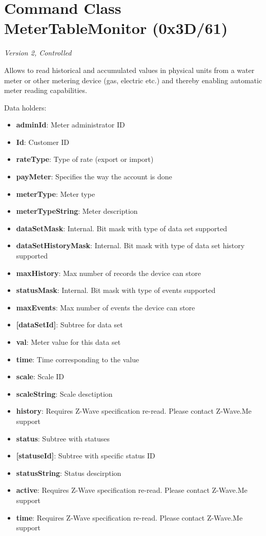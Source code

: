 \section{Command Class MeterTableMonitor (0x3D/61)}

\textit{Version 2, Controlled}
\newline

Allows to read historical and accumulated values in physical units from a water meter or other metering device (gas, electric etc.) and thereby enabling automatic meter reading capabilities.
\newline

\noindent
Data holders:

\begin{itemize}
\item \textbf{adminId}: Meter administrator ID
\item \textbf{Id}: Customer ID
\item \textbf{rateType}: Type of rate (export or import)
\item \textbf{payMeter}: Specifies the way the account is done
\item \textbf{meterType}: Meter type
\item \textbf{meterTypeString}: Meter description
\item \textbf{dataSetMask}: Internal. Bit mask with type of data set supported
\item \textbf{dataSetHistoryMask}: Internal. Bit mask with type of data set history supported
\item \textbf{maxHistory}: Max number of records the device can store
\item \textbf{statusMask}: Internal. Bit mask with type of events supported
\item \textbf{maxEvents}: Max number of events the device can store
\item \textbf{[dataSetId]}: Subtree for data set
\item \qquad\textbf{val}: Meter value for this data set
\item \qquad\textbf{time}: Time corresponding to the value
\item \qquad\textbf{scale}: Scale ID
\item \qquad\textbf{scaleString}: Scale desctiption
\item \qquad\textbf{history}: Requires Z-Wave specification re-read. Please contact Z-Wave.Me support
\item \textbf{status}: Subtree with statuses
\item \qquad\textbf{[statuseId]}: Subtree with specific status ID
\item \qquad\qquad\textbf{statusString}: Status descirption
\item \qquad\qquad\textbf{active}: Requires Z-Wave specification re-read. Please contact Z-Wave.Me support
\item \qquad\qquad\textbf{time}: Requires Z-Wave specification re-read. Please contact Z-Wave.Me support
\end{itemize}

